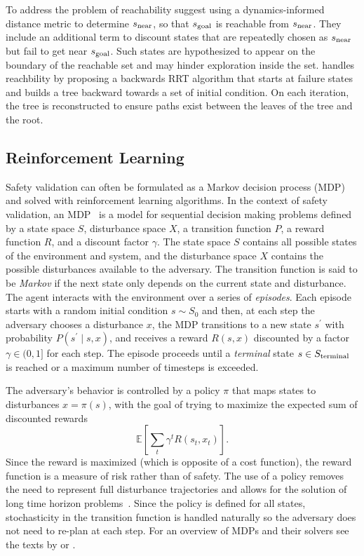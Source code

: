 To address the problem of reachability \textcite{kim2005rrt} suggest using a dynamics-informed distance metric to determine $s_{\rm near}$, so that $s_{\rm goal}$ is reachable from $s_{\rm near}$. They include an additional term to discount states that are repeatedly chosen as $s_{\rm near}$ but fail to get near $s_{\rm goal}$. Such states are hypothesized to appear on the boundary of the reachable set and may hinder exploration inside the set. \textcite{koschi2019computationally} handles reachbility by proposing a backwards RRT algorithm that starts at failure states and builds a tree backward towards a set of initial condition. On each iteration, the tree is reconstructed to ensure paths exist between the leaves of the tree and the root. 


\subsection{Reinforcement Learning}
\label{ch2:rl}
Safety validation can often be formulated as a Markov decision process (MDP) and solved with reinforcement learning algorithms. In the context of safety validation, an MDP~\cite{dmubook} is a model for sequential decision making problems defined by a state space $S$, disturbance space $X$, a transition function $P$, a reward function $R$, and a discount factor $\gamma$. The state space $S$ contains all possible states of the environment and system, and the disturbance space $X$ contains the possible disturbances available to the adversary. The transition function is said to be \emph{Markov} if the next state only depends on the current state and disturbance. The agent interacts with the environment over a series of \emph{episodes}. Each episode starts with a random initial condition $s \sim S_0$ and then, at each step the adversary chooses a disturbance $x$, the MDP transitions to a new state $s^\prime$ with probability $P(s^\prime \mid s, x)$, and receives a reward $R(s, x)$ discounted by a factor $\gamma \in (0,1]$ for each step. The episode proceeds until a \emph{terminal} state $s \in S_{\rm terminal}$ is reached or a maximum number of timesteps is exceeded.

The adversary's behavior is controlled by a policy $\pi$ that maps states to disturbances $x = \pi(s)$, with the goal of trying to maximize the expected sum of discounted rewards 
\begin{equation}
    \mathbb{E}\left[ \sum_t \gamma^t R(s_t, x_t) \right] \text{.}
\end{equation}
Since the reward is maximized (which is opposite of a cost function), the reward function is a measure of risk rather than of safety. The use of a policy removes the need to represent full disturbance trajectories and allows for the solution of long time horizon problems~\cite{koren2018adaptive}. Since the policy is defined for all states, stochasticity in the transition function is handled naturally so the adversary does not need to re-plan at each step. For an overview of MDPs and their solvers see the texts by \textcite{dmubook} or \textcite{sutton2018reinforcement}. 

